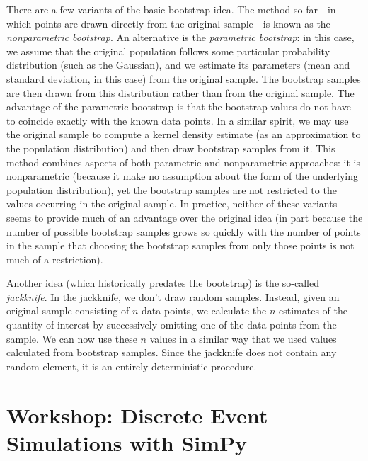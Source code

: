 There are a few variants of the basic bootstrap idea. The method so
far---in which points are drawn directly from the original sample---is
known as the \emph{nonparametric bootstrap}.  An alternative is
the
\emph{parametric bootstrap}:  in this case, we assume that the original
population follows some particular probability distribution (such as
the Gaussian), and we estimate its parameters (mean and standard
deviation, in this case) from the original sample. The bootstrap
samples are then drawn from this distribution rather than from the
original sample. The advantage of the parametric bootstrap is that the
bootstrap values do not have to coincide exactly with the known data
points. In a similar spirit, we may use the original sample to compute
a kernel density estimate (as an approximation to the population
distribution) and then draw bootstrap samples from it. This method
combines aspects of both parametric and nonparametric approaches: it
is nonparametric (because it make no assumption about the form of the
underlying population distribution), yet the bootstrap samples are not
restricted to the values occurring in the original sample. In
practice, neither of these variants seems to provide much of an
advantage over the original idea (in part because the number of
possible bootstrap samples grows so quickly with the number of points
in the sample that choosing the bootstrap samples from only those
points is not much of a restriction).

Another idea (which historically predates the bootstrap) is the
so-called \emph{jackknife}.  In the jackknife, we don't draw random
samples. Instead, given an original sample consisting of $n$ data
points, we calculate the $n$ estimates of the quantity of interest by
successively omitting one of the data points from the sample. We can
now use these $n$ values in a similar way that we used values
calculated from bootstrap samples. Since the jackknife does not
contain any random element, it is an entirely deterministic procedure.


\vspace*{-6pt}
\section{Workshop: Discrete Event Simulations with SimPy}

